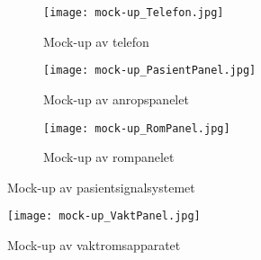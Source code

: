\begin{figure}[H]
	\centering
	\begin{subfigure}[b]{0.25\textwidth}
		\centering
		\texttt{[image: mock-up\_Telefon.jpg]}
		\caption{Mock-up av telefon}
		\label{mock-up_Telefon}
	\end{subfigure}
	\begin{subfigure}[b]{0.35\textwidth}
		\centering
		\texttt{[image: mock-up\_PasientPanel.jpg]}
		\caption{Mock-up av anropspanelet}
		\label{mock-up_PasientPanel}
	\end{subfigure}
	\begin{subfigure}[b]{0.35\textwidth}
		\centering
		\texttt{[image: mock-up\_RomPanel.jpg]}
		\caption{Mock-up av rompanelet}
		\label{mock-up_RomPanel}
	\end{subfigure}
	\caption{Mock-up av pasientsignalsystemet}
	\label{systemmockup}
\end{figure}

\begin{figure}[H]
\centering
\texttt{[image: mock-up\_VaktPanel.jpg]}
\caption{Mock-up av vaktromsapparatet}
\label{mock-up_VaktPanel}
\end{figure}

